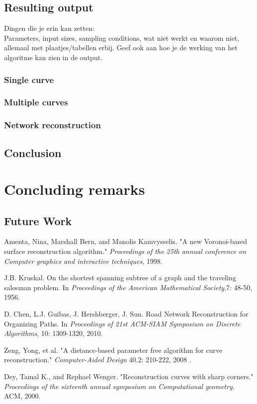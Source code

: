 \documentclass[11pt]{article}
\begin{document}
\subsection{Resulting output}
Dingen die je erin kan zetten:\\
Parameters, input sizes, sampling conditions, wat niet werkt en waarom niet, allemaal met plaatjes/tabellen erbij. Geef ook aan hoe je de werking van het algoritme kan zien in de output.
\subsubsection{Single curve}
\subsubsection{Multiple curves}
\subsubsection{Network reconstruction}

\subsection{Conclusion}

\section{Concluding remarks}


\subsection{Future Work}


\begin{thebibliography}{50}


Amenta, Nina, Marshall Bern, and Manolis Kamvysselis. 
"A new Voronoi-based surface reconstruction algorithm." 
\textit{Proceedings of the 25th annual conference on Computer graphics and interactive techniques}, 1998.

J.B. Kruskal.
On the shortest spanning subtree of a graph and the traveling salesman problem.
In \emph{Proceedings of the American Mathematical Society},7: 48-50, 1956.

D. Chen, L.J. Guibas, J. Hershberger, J. Sun.
Road Network Reconstruction for Organizing Paths.
In \emph{Proceedings  of  21st  ACM-SIAM  Symposium  on  Discrete  Algorithms}, 10: 1309-1320, 2010.

Zeng, Yong, et al. "A distance-based parameter free algorithm for curve reconstruction." \textit{Computer-Aided Design} 40.2: 210-222, 2008 .

Dey, Tamal K., and Rephael Wenger. "Reconstruction curves with sharp corners." \textit{Proceedings of the sixteenth annual symposium on Computational geometry.} ACM, 2000.




\end{thebibliography}
\end{document}
